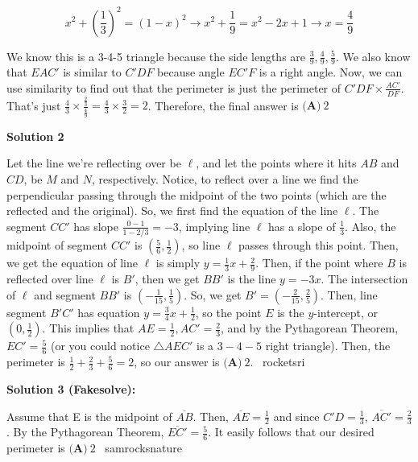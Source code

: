 \begin{enumerate}
 
 \[x^2 + \left(\frac{1}{3}\right)^2 = (1-x)^2 \rightarrow x^2 + \frac{1}{9} = x^2 - 2x + 1 \rightarrow x=\frac{4}{9}\]

 We know this is a 3-4-5 triangle because the side lengths are $\frac{3}{9}, \frac{4}{9}, \frac{5}{9}$. We also know that $EAC'$ is similar to $C'DF$ because angle $EC'F$ is a right angle. Now, we can use similarity to find out that the perimeter is just the perimeter of $C'DF \times \frac{AC'}{DF}$. That's just $\frac{4}{3} \times \frac{\frac{2}{3}}{\frac{4}{9}} = \frac{4}{3} \times \frac{3}{2} = 2$. Therefore, the final answer is $\boxed{\textbf{(A)} ~2}$




\textbf{Solution 2}

Let the line we're reflecting over be $\ell$, and let the points where it hits $AB$ and $CD$, be $M$ and $N$, respectively. Notice, to reflect over a line we find the perpendicular passing through the midpoint of the two points (which are the reflected and the original). So, we first find the equation of the line $\ell$. The segment $CC'$ has slope $\frac{0 - 1}{1 - 2/3} = -3$, implying line $\ell$ has a slope of $\frac{1}{3}$. Also, the midpoint of segment $CC'$ is $\left( \frac{5}{6}, \frac{1}{2} \right)$, so line $\ell$ passes through this point. Then, we get the equation of line $\ell$ is simply $y = \frac{1}{3} x + \frac{2}{9}$. Then, if the point where $B$ is reflected over line $\ell$ is $B'$, then we get $BB'$ is the line $y = -3x$. The intersection of $\ell$ and segment $BB'$ is $\left( - \frac{1}{15}, \frac{1}{5} \right)$. So, we get $B' = \left(- \frac{2}{15}, \frac{2}{5} \right)$. Then, line segment $B'C'$ has equation $y = \frac{3}{4} x + \frac{1}{2}$, so the point $E$ is the $y$-intercept, or $\left(0, \frac{1}{2} \right)$. This implies that $AE = \frac{1}{2}, AC' = \frac{2}{3}$, and by the Pythagorean Theorem, $EC' = \frac{5}{6}$ (or you could notice $\triangle AEC'$ is a $3-4-5$ right triangle). Then, the perimeter is $\frac{1}{2} + \frac{2}{3} + \frac{5}{6} = 2$, so our answer is $\boxed{\textbf{(A)} ~2}$. ~rocketsri

 



\textbf{Solution 3 (Fakesolve):}

Assume that E is the midpoint of $\overline{AB}$. Then, $\overline{AE}=\frac{1}{2}$ and since $C'D=\frac{1}{3}$, $\overline{AC'}=\frac{2}{3}$. By the Pythagorean Theorem, $\overline{EC'}=\frac{5}{6}$. It easily follows that our desired perimeter is $\boxed{\textbf{(A)} ~2}$ ~samrocksnature


\end{enumerate}
